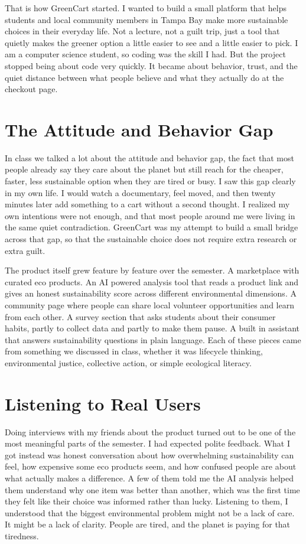 \documentclass[12pt,letterpaper]{article}
\begin{document}
That is how GreenCart started. I wanted to build a small platform that helps students and local community members in Tampa Bay make more sustainable choices in their everyday life. Not a lecture, not a guilt trip, just a tool that quietly makes the greener option a little easier to see and a little easier to pick. I am a computer science student, so coding was the skill I had. But the project stopped being about code very quickly. It became about behavior, trust, and the quiet distance between what people believe and what they actually do at the checkout page.

\section{The Attitude and Behavior Gap}

In class we talked a lot about the attitude and behavior gap, the fact that most people already say they care about the planet but still reach for the cheaper, faster, less sustainable option when they are tired or busy. I saw this gap clearly in my own life. I would watch a documentary, feel moved, and then twenty minutes later add something to a cart without a second thought. I realized my own intentions were not enough, and that most people around me were living in the same quiet contradiction. GreenCart was my attempt to build a small bridge across that gap, so that the sustainable choice does not require extra research or extra guilt.

The product itself grew feature by feature over the semester. A marketplace with curated eco products. An AI powered analysis tool that reads a product link and gives an honest sustainability score across different environmental dimensions. A community page where people can share local volunteer opportunities and learn from each other. A survey section that asks students about their consumer habits, partly to collect data and partly to make them pause. A built in assistant that answers sustainability questions in plain language. Each of these pieces came from something we discussed in class, whether it was lifecycle thinking, environmental justice, collective action, or simple ecological literacy.

\section{Listening to Real Users}

Doing interviews with my friends about the product turned out to be one of the most meaningful parts of the semester. I had expected polite feedback. What I got instead was honest conversation about how overwhelming sustainability can feel, how expensive some eco products seem, and how confused people are about what actually makes a difference. A few of them told me the AI analysis helped them understand why one item was better than another, which was the first time they felt like their choice was informed rather than lucky. Listening to them, I understood that the biggest environmental problem might not be a lack of care. It might be a lack of clarity. People are tired, and the planet is paying for that tiredness.
\end{document}
